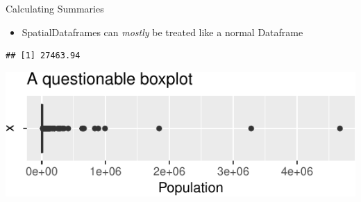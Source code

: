 \documentclass[10pt,ignorenonframetext,]{beamer}
\newenvironment{Shaded}{\begin{snugshade}}{\end{snugshade}}
\newcommand{\KeywordTok}[1]{\textcolor[rgb]{0.13,0.29,0.53}{\textbf{{#1}}}}
\newcommand{\DataTypeTok}[1]{\textcolor[rgb]{0.13,0.29,0.53}{{#1}}}
\newcommand{\StringTok}[1]{\textcolor[rgb]{0.31,0.60,0.02}{{#1}}}
\newcommand{\CommentTok}[1]{\textcolor[rgb]{0.56,0.35,0.01}{\textit{{#1}}}}
\newcommand{\NormalTok}[1]{{#1}}
\providecommand{\tightlist}{%
  \setlength{\itemsep}{0pt}\setlength{\parskip}{0pt}}
\begin{document}
\begin{frame}[fragile]{Calculating Summaries}

\begin{itemize}
\tightlist
\item
  SpatialDataframes can \emph{mostly} be treated like a normal Dataframe
\end{itemize}

\begin{Shaded}
\end{Shaded}

\begin{verbatim}
## [1] 27463.94
\end{verbatim}

\begin{Shaded}
\end{Shaded}

\begin{center}\includegraphics[width=0.8\linewidth]{SpatialDataLecture_files/figure-beamer/unnamed-chunk-17-1} \end{center}

\end{frame}
\end{document}
